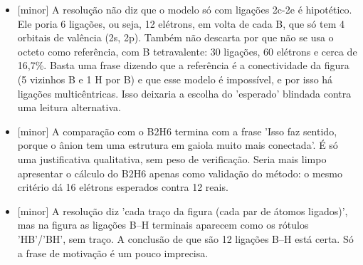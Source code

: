 \documentclass{article}%
\begin{document}
\begin{itemize}%
\item%
{[}minor{]} A resolução não diz que o modelo só com ligações 2c{-}2e é hipotético. Ele poria 6 ligações, ou seja, 12 elétrons, em volta de cada B, que só tem 4 orbitais de valência (2s, 2p). Também não descarta por que não se usa o octeto como referência, com B tetravalente: 30 ligações, 60 elétrons e cerca de 16,7\%. Basta uma frase dizendo que a referência é a conectividade da figura (5 vizinhos B e 1 H por B) e que esse modelo é impossível, e por isso há ligações multicêntricas. Isso deixaria a escolha do 'esperado' blindada contra uma leitura alternativa.%
\item%
{[}minor{]} A comparação com o B2H6 termina com a frase 'Isso faz sentido, porque o ânion tem uma estrutura em gaiola muito mais conectada'. É só uma justificativa qualitativa, sem peso de verificação. Seria mais limpo apresentar o cálculo do B2H6 apenas como validação do método: o mesmo critério dá 16 elétrons esperados contra 12 reais.%
\item%
{[}minor{]} A resolução diz 'cada traço da figura (cada par de átomos ligados)', mas na figura as ligações B--H terminais aparecem como os rótulos 'HB'/'BH', sem traço. A conclusão de que são 12 ligações B--H está certa. Só a frase de motivação é um pouco imprecisa.%
\end{itemize}%
\end{document}
